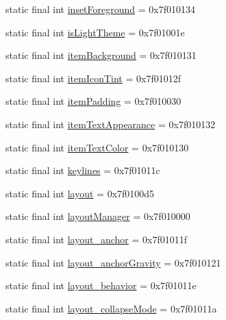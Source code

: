 \begin{CompactItemize}
\item 
static final int \hyperlink{classandroid_1_1support_1_1v7_1_1appcompat_1_1_r_1_1attr_507dc3a5a042cd883cf35f116ed1677a}{insetForeground} = 0x7f010134
\item 
static final int \hyperlink{classandroid_1_1support_1_1v7_1_1appcompat_1_1_r_1_1attr_bc852b34691fe03b4e44887e8134abff}{isLightTheme} = 0x7f01001e
\item 
static final int \hyperlink{classandroid_1_1support_1_1v7_1_1appcompat_1_1_r_1_1attr_3c4f9aaff1af6afeaee61e3478cac03d}{itemBackground} = 0x7f010131
\item 
static final int \hyperlink{classandroid_1_1support_1_1v7_1_1appcompat_1_1_r_1_1attr_39c38045f45226936a4b171ad3a11454}{itemIconTint} = 0x7f01012f
\item 
static final int \hyperlink{classandroid_1_1support_1_1v7_1_1appcompat_1_1_r_1_1attr_932d94354899995f8e19447a584c8c06}{itemPadding} = 0x7f010030
\item 
static final int \hyperlink{classandroid_1_1support_1_1v7_1_1appcompat_1_1_r_1_1attr_d692b8c63d24555f86b0f331618e7d38}{itemTextAppearance} = 0x7f010132
\item 
static final int \hyperlink{classandroid_1_1support_1_1v7_1_1appcompat_1_1_r_1_1attr_3c984c8c0fdcea7f4fc5bd9ba206736f}{itemTextColor} = 0x7f010130
\item 
static final int \hyperlink{classandroid_1_1support_1_1v7_1_1appcompat_1_1_r_1_1attr_cba39030dcc0b157aacafb916426f914}{keylines} = 0x7f01011c
\item 
static final int \hyperlink{classandroid_1_1support_1_1v7_1_1appcompat_1_1_r_1_1attr_3b4bbe86d96dac362ce866e10256357e}{layout} = 0x7f0100d5
\item 
static final int \hyperlink{classandroid_1_1support_1_1v7_1_1appcompat_1_1_r_1_1attr_fb3c774917c8d1d641730fc94fa11edf}{layoutManager} = 0x7f010000
\item 
static final int \hyperlink{classandroid_1_1support_1_1v7_1_1appcompat_1_1_r_1_1attr_6a44f9677905033a02669f6930535abf}{layout\_\-anchor} = 0x7f01011f
\item 
static final int \hyperlink{classandroid_1_1support_1_1v7_1_1appcompat_1_1_r_1_1attr_4c02ef593578f0fd5c2d03bf766a3956}{layout\_\-anchorGravity} = 0x7f010121
\item 
static final int \hyperlink{classandroid_1_1support_1_1v7_1_1appcompat_1_1_r_1_1attr_765d70239fdbca8538f0c4ea6f76ca78}{layout\_\-behavior} = 0x7f01011e
\item 
static final int \hyperlink{classandroid_1_1support_1_1v7_1_1appcompat_1_1_r_1_1attr_579195d630ac3e197218ab8e78f1d819}{layout\_\-collapseMode} = 0x7f01011a

\end{CompactItemize}
